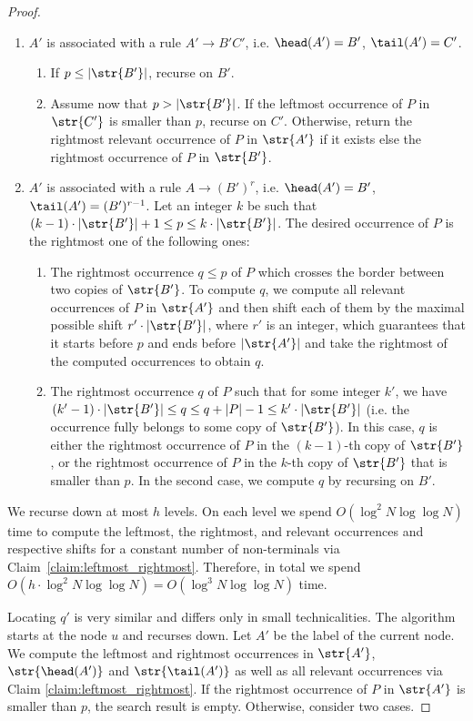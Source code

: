\begin{proof}
\begin{enumerate}
\item $A'$ is associated with a rule $A' \rightarrow B'C'$, i.e. $\head(A') = B'$, $\tail(A') = C'$. 
\begin{enumerate}
\item If $p \le |\str{B'}|$, recurse on $B'$. 
\item Assume now that $p > |\str{B'}|$. If the leftmost  occurrence of $P$ in $\str{C'}$ is smaller than $p$, recurse on $C'$. Otherwise, return the rightmost relevant occurrence of $P$ in $\str{A'}$ if it exists else the rightmost occurrence of $P$ in $\str{B'}$. 
\end{enumerate}
\item $A'$ is associated with a rule $A \rightarrow (B')^r$, i.e. $\head(A') = B'$, $\tail(A') = (B')^{r-1}$.  Let an integer $k$ be such that $(k-1) \cdot |\str{B'}|+1 \le p \le k \cdot |\str{B'}|$. The desired occurrence of $P$ is the rightmost one of the following ones:
\begin{enumerate}
	\item The rightmost occurrence $q \le p$ of $P$ which crosses the border between two copies of $\str{B'}$. To compute $q$, we compute all relevant occurrences of $P$ in $\str{A'}$ and then shift each of them by the maximal possible shift $r' \cdot |\str{B'}|$, where $r'$ is an integer, which guarantees that it starts before $p$ and ends before $|\str{A'}|$ and take the rightmost of the computed occurrences to obtain $q$.
	\item The rightmost occurrence $q$ of $P$ such that for some integer $k'$, we have $(k'-1) \cdot |\str{B'}| \le q \le q+|P|-1 \le k' \cdot |\str{B'}|$ (i.e. the occurrence fully belongs to some copy of $\str{B'}$). In this case, $q$ is either the rightmost occurrence of $P$ in the $(k-1)$-th copy of $\str{B'}$, or the rightmost occurrence of $P$ in the $k$-th copy of $\str{B'}$ that is smaller than $p$. In the second case, we compute $q$ by recursing on $B'$.
	\end{enumerate}
\end{enumerate}
 We recurse down at most $h$ levels. On each level we spend $O(\log^{2} N\log\log N)$ time to compute the leftmost, the rightmost, and relevant occurrences and respective shifts for a constant number of non-terminals via Claim~\ref{claim:leftmost_rightmost}. Therefore, in total we spend $O(h \cdot \log^{2} N\log\log N) = O(\log^{3} N\log\log N)$ time. 
 
 
Locating $q'$ is very similar and differs only in small technicalities. The algorithm starts at the node $u$ and recurses down. Let $A'$ be the label of the current node. We compute the leftmost and rightmost occurrences in $\str{A'}$, $\str{\head(A')}$ and $\str{\tail(A')}$ as well as all relevant occurrences via Claim \ref{claim:leftmost_rightmost}. If the rightmost occurrence of $P$ in $\str{A'}$ is smaller than $p$, the search result is empty. Otherwise, consider two cases. 


\end{proof}
